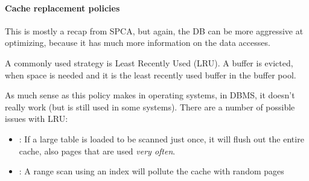 \paragraph{Cache replacement policies}
This is mostly a recap from SPCA, but again, the DB can be more aggressive at optimizing, because it has much more information on the data accesses.

A commonly used strategy is Least Recently Used (LRU).
A buffer is evicted, when space is needed and it is the least recently used buffer in the buffer pool.

As much sense as this policy makes in operating systems, in DBMS, it doesn't really work (but is still used in some systems).
There are a number of possible issues with LRU:
\begin{itemize}
    \item {}: If a large table is loaded to be scanned just once, it will flush out the entire cache, also pages that are used \textit{very often}.
    \item {}: A range scan using an index will pollute the cache with random pages
\end{itemize}

